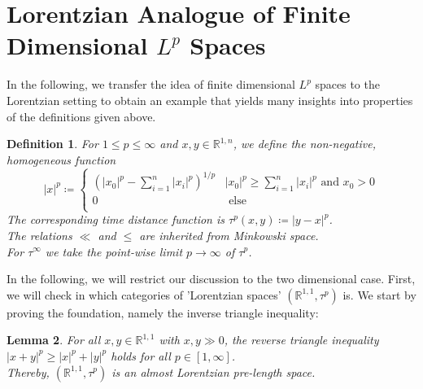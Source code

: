 \documentclass[11pt, a4paper]{article} %
\newcommand{\R}{\mathbb{R}} %
\newtheorem{definition}{Definition}[section]
\newtheorem{lemma}[definition]{Lemma}
\theoremstyle{plain} %
\newcommand{\mDef}{\coloneqq }
\begin{document}
\section{Lorentzian Analogue of Finite Dimensional \texorpdfstring{$L^p$}{TEXT} Spaces}
In the following, we transfer the idea of finite dimensional $L^p$ spaces to the Lorentzian setting to obtain an example that yields many insights into properties of the definitions given above.
\begin{definition}
For $1\leq p\leq \infty$ and $x,y\in\R^{1,n}$, we define the non-negative, homogeneous function
$$|x|^p \mDef
\begin{cases}
\left(|x_0|^p - \sum_{i=1}^n |x_i|^p \right)^{1/p} & |x_0|^p \geq\sum_{i=1}^n |x_i|^p \text{ and } x_0>0\\
0 & \text{ else } \\
\end{cases}$$
The corresponding time distance function is $\tau^p(x,y)\mDef |y-x|^p$.\\
The relations $\ll$ and $\leq$ are inherited from Minkowski space.\\
For $\tau^\infty$ we take the point-wise limit $p \to \infty$ of $\tau^p$.
\end{definition}
In the following, we will restrict our discussion to the two dimensional case. 
First, we will check in which categories of 'Lorentzian spaces' $(\R^{1,1},\tau^p)$ is.
We start by proving the foundation, namely the inverse triangle inequality:
\begin{lemma}
For all $x,y\in\R^{1,1}$ with $x, y \gg 0$, the reverse triangle inequality \\$|x+y|^p \geq |x|^p+|y|^p$ holds for all $p\in [1,\infty]$.\\
Thereby, $(\R^{1,1},\tau^p)$ is an almost Lorentzian pre-length space.
\end{lemma}
\end{document}
